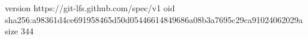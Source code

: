 version https://git-lfs.github.com/spec/v1
oid sha256:a98361d4ce691958465d50d05446614849686a08b3a7695c29ca91024062029a
size 344
